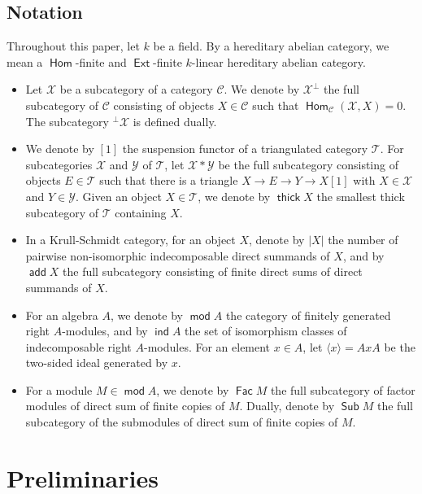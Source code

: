 \documentclass[12pt,a4paper,reqno]{amsart}
\theoremstyle{definition}
\newcommand{\opname}[1]{\operatorname{\mathsf{#1}}}
\renewcommand{\mod}{\opname{mod}\nolimits}
\newcommand{\add}{\opname{add}\nolimits}
\newcommand{\ind}{\opname{ind}}
\newcommand{\Sub}{\opname{Sub}}
\newcommand{\Fac}{\opname{Fac}}
\newcommand{\thick}{\opname{thick}}
\newcommand{\Hom}{\opname{Hom}}
\newcommand{\Ext}{\opname{Ext}}
\begin{document}
\subsection*{Notation}
Throughout this paper, let $k$ be a field. By a hereditary abelian category, we mean a $\Hom$-finite and $\Ext$-finite $k$-linear hereditary abelian category.
\begin{itemize}
\item Let $\mathcal{X}$ be a subcategory of a category $\mathcal{C}$. We denote by $\mathcal{X}^\perp$ the full subcategory of $\mathcal{C}$ consisting of objects $X \in \mathcal{C}$ such that $\Hom_\mathcal{C}(\mathcal{X}, X) = 0$. The subcategory $^\perp\mathcal{X}$ is defined dually.

\item We denote by $[1]$ the suspension functor of a triangulated category $\mathcal{T}$. For subcategories $\mathcal{X}$ and $\mathcal{Y}$ of $\mathcal{T}$, let $\mathcal{X} * \mathcal{Y}$ be the full subcategory consisting of objects $E \in \mathcal{T}$ such that there is a triangle $X \to E \to Y \to X[1]$ with $X \in \mathcal{X}$ and $Y \in \mathcal{Y}$. Given an object $X\in\mathcal{T}$, we denote by $\thick X$ the smallest thick subcategory of $\mathcal{T}$ containing $X$.
\item In a Krull-Schmidt category, for an object $X$, denote by $|X|$ the number of pairwise non-isomorphic indecomposable direct summands of $X$, and by $\add X$ the full subcategory consisting of finite direct sums of direct summands of $X$.
\item For an algebra $A$, we denote by $\mod A$ the category of finitely generated right $A$-modules, and by $\ind A$ the set of isomorphism classes of indecomposable right $A$-modules. For an element $x \in A$, let $\langle x \rangle = AxA$ be the two-sided ideal generated by $x$.
\item For a module $M \in \mod A$, we denote by $\Fac M$ the full subcategory of factor modules of direct sum of finite copies of $M$. Dually, denote by $\Sub M$ the full subcategory of the submodules of direct sum of finite copies of $M$.

\end{itemize}

 
\section{Preliminaries}  \label{s:preliminary}
\end{document}
